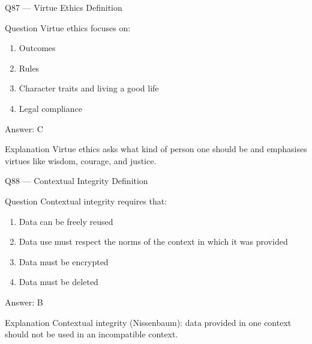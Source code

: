 \documentclass[aspectratio=169,8pt]{beamer}
\begin{document}
	\begin{frame}{Q87 --- Virtue Ethics Definition}
		\begin{block}{Question}
			Virtue ethics focuses on:
			\begin{enumerate}
				\item Outcomes
				\item Rules
				\item Character traits and living a good life
				\item Legal compliance
			\end{enumerate}
		\end{block}
		\begin{exampleblock}{Answer: C}\end{exampleblock}
		\begin{block}{Explanation}
			Virtue ethics asks what kind of person one should be and emphasises virtues like wisdom, courage, and justice.
		\end{block}
	\end{frame}
	
	\begin{frame}{Q88 --- Contextual Integrity Definition}
		\begin{block}{Question}
			Contextual integrity requires that:
			\begin{enumerate}
				\item Data can be freely reused
				\item Data use must respect the norms of the context in which it was provided
				\item Data must be encrypted
				\item Data must be deleted
			\end{enumerate}
		\end{block}
		\begin{exampleblock}{Answer: B}\end{exampleblock}
		\begin{block}{Explanation}
			Contextual integrity (Nissenbaum): data provided in one context should not be used in an incompatible context.
		\end{block}
	\end{frame}
	
\end{document}

